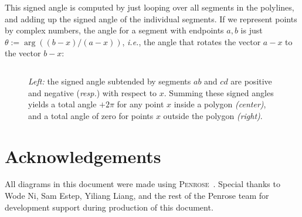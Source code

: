 \documentclass{article}
\newcommand{\figloc}[1]{\textit{#1}}
\newcommand{\ie}{\emph{i.e.}} %
\newcommand{\resp}{\emph{resp.}} %
\renewcommand{\vec}[1]{#1}
\begin{document}
\inputminted[fontsize=\small,linenos,firstline=191,lastline=202,bgcolor=bg]{cpp}{../code/WoStLaplace2D.cpp}

This signed angle is computed by just looping over all segments in the polylines, and adding up the signed angle of the individual segments.  If we represent points by complex numbers, the angle for a segment with endpoints \(\vec{a},\vec{b}\) is just \(\theta := \arg((\vec{b}-\vec{x})/(\vec{a}-\vec{x}))\), \ie, the angle that rotates the vector \(\vec{a}-\vec{x}\) to the vector \(\vec{b}-\vec{x}\):

\inputminted[fontsize=\small,linenos,firstline=182,lastline=189,bgcolor=bg]{cpp}{../code/WoStLaplace2D.cpp}

\begin{figure}[h!]
   
   
   
   \caption{\emph{Left:} the signed angle subtended by segments \(ab\) and \(cd\) are positive and negative (\resp{}) with respect to \(x\). Summing these signed angles yields a total angle \(+2\pi\) for any point \(x\) inside a polygon \figloc{(center)}, and a total angle of zero for points \(x\) outside the polygon \figloc{(right)}.\label{fig:InsideOutside}}
\end{figure}


\section*{Acknowledgements} All diagrams in this document were made using \textsc{Penrose}~\citep{Ye:2020:PFM}.  Special thanks to Wode Ni, Sam Estep, Yiliang Liang, and the rest of the Penrose team for development support during production of this document.



\end{document}
